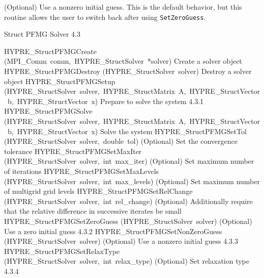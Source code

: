 \documentclass{article}
\begin{document}
\begin{cxxentry}
\begin{cxxentry}
\begin{cxxfunction}
\begin{cxxdoc}
(Optional) Use a nonzero initial guess.  This is the default behavior, but
this routine allows the user to switch back after using {\tt SetZeroGuess}.
\end{cxxdoc}
\end{cxxfunction}
\end{cxxentry}
\begin{cxxentry}
{}
        {Struct PFMG Solver}
        {}
        {
}
        {4.3}
\begin{cxxnames}
        {HYPRE\_StructPFMGCreate}
        {(MPI\_Comm\ comm,\ HYPRE\_StructSolver\ *solver)}
        {
Create a solver object}
        {}
\label{cxx.4.3.7}
        {HYPRE\_StructPFMGDestroy}
        {(HYPRE\_StructSolver\ solver)}
        {
Destroy a solver object}
        {}
\label{cxx.4.3.8}
        {HYPRE\_StructPFMGSetup}
        {(HYPRE\_StructSolver\ solver,\ HYPRE\_StructMatrix\ A,\ HYPRE\_StructVector\ b,\ HYPRE\_StructVector\ x)}
        {
Prepare to solve the system}
        {4.3.1}
        {HYPRE\_StructPFMGSolve}
        {(HYPRE\_StructSolver\ solver,\ HYPRE\_StructMatrix\ A,\ HYPRE\_StructVector\ b,\ HYPRE\_StructVector\ x)}
        {
Solve the system}
        {}
\label{cxx.4.3.9}
        {HYPRE\_StructPFMGSetTol}
        {(HYPRE\_StructSolver\ solver,\ double\ tol)}
        {
(Optional) Set the convergence tolerance}
        {}
\label{cxx.4.3.10}
        {HYPRE\_StructPFMGSetMaxIter}
        {(HYPRE\_StructSolver\ solver,\ int\ max\_iter)}
        {
(Optional) Set maximum number of iterations}
        {}
\label{cxx.4.3.11}
        {HYPRE\_StructPFMGSetMaxLevels}
        {(HYPRE\_StructSolver\ solver,\ int\ max\_levels)}
        {
(Optional) Set maximum number of multigrid grid levels}
        {}
\label{cxx.4.3.12}
        {HYPRE\_StructPFMGSetRelChange}
        {(HYPRE\_StructSolver\ solver,\ int\ rel\_change)}
        {
(Optional) Additionally require that the relative difference in
successive iterates be small}
        {}
\label{cxx.4.3.13}
        {HYPRE\_StructPFMGSetZeroGuess}
        {(HYPRE\_StructSolver\ solver)}
        {
(Optional) Use a zero initial guess}
        {4.3.2}
        {HYPRE\_StructPFMGSetNonZeroGuess}
        {(HYPRE\_StructSolver\ solver)}
        {
(Optional) Use a nonzero initial guess}
        {4.3.3}
        {HYPRE\_StructPFMGSetRelaxType}
        {(HYPRE\_StructSolver\ solver,\ int\ relax\_type)}
        {
(Optional) Set relaxation type}
        {4.3.4}

\end{cxxnames}
\end{cxxentry}
\end{cxxentry}
\end{document}
